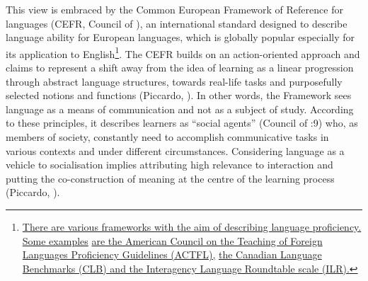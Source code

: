 This view is embraced by the Common European Framework of Reference for languages (CEFR, Council of \citealt{Europe2001}), an international standard designed to describe language ability for European languages, which is globally popular especially for its application to English\footnote{\href{../../../../../../../../C:/Users/ssbra/OneDrive/Desktop/Diss\%20for\%20publication/thesis\%20GOOD_EDITING.docx\#_bookmark291}{{There are various frameworks with the aim of describing language proficiency. Some examples}} \href{../../../../../../../../C:/Users/ssbra/OneDrive/Desktop/Diss\%20for\%20publication/thesis\%20GOOD_EDITING.docx\#_bookmark291}{{are the American Council on the Teaching of Foreign Languages Proficiency Guidelines (ACTFL),}} \href{../../../../../../../../C:/Users/ssbra/OneDrive/Desktop/Diss\%20for\%20publication/thesis\%20GOOD_EDITING.docx\#_bookmark291}{{the Canadian Language Benchmarks (CLB) and the Interagency Language Roundtable scale (ILR).}}}. The CEFR builds on an action-oriented approach and claims to represent a shift away from the idea of learning as a linear progression through abstract language structures, towards real-life tasks and purposefully selected notions and functions (Piccardo, \citealt{GoodierNorth2018}). In other words, the Framework sees language as a means of communication and not as a subject of study. According to these principles, it describes learners as “social agents” (Council of \citealt{Europe2001}:9) who, as members of society, constantly need to accomplish communicative tasks in various contexts and under different circumstances. Considering language as a vehicle to socialisation implies attributing high relevance to interaction and putting the co-construction of meaning at the centre of the learning process (Piccardo, \citealt{GoodierNorth2018}). 

